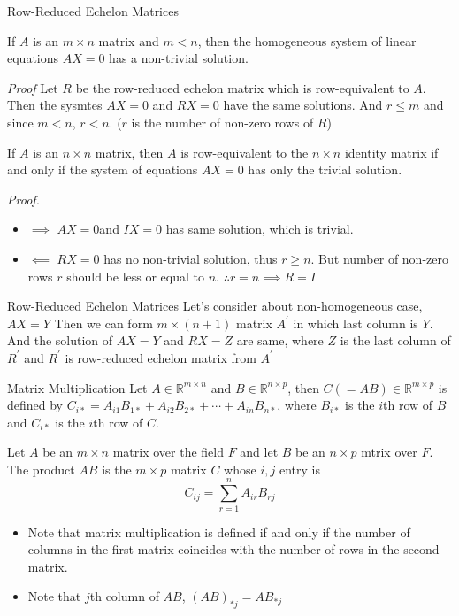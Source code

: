 \documentclass[8pt]{beamer}
\newcommand{\mbb}[1]{\mathbb{#1}}
\newcommand{\ti}[1]{\textit{#1}}
\begin{document}
\begin{frame}{Row-Reduced Echelon Matrices}
  \begin{theorem}
    If $A$ is an $m \times n$ matrix and $m < n$, then the homogeneous system of linear equations $AX=0$ has a non-trivial solution.
  \end{theorem}
  \ti{Proof} Let $R$ be the row-reduced echelon matrix which is row-equivalent to $A$. Then the sysmtes $AX = 0$ and $RX=0$ have the same solutions. And $r \leq m$ and since $m < n$, $r < n$. ($r$ is the number of non-zero rows of $R$)

  \begin{theorem}\label{th:1}
    If $A$ is an $n \times n$ matrix, then $A$ is row-equivalent to the $n\times n$ identity matrix if and only if the system of equations $AX = 0$ has only the trivial solution.
  \end{theorem}
  \ti{Proof.} 
  \begin{itemize}
    \item $\implies$ $AX =0 $and $IX = 0$ has same solution, which is trivial.
    \item  $\impliedby$  $RX = 0$ has no non-trivial solution, thus $r \geq n$. But number of non-zero rows $r$ should be less or equal to $n$. $\therefore r = n \implies R = I$
  \end{itemize}
\end{frame}

\begin{frame}{Row-Reduced Echelon Matrices}
  Let's consider about non-homogeneous case, $AX = Y$
  Then we can form $m \times (n +1)$ matrix $A^\prime$ in which last column is $Y$. And the solution of $AX=Y$ and $RX=Z$ are same, where $Z$ is the last column of $R^\prime$ and $R^\prime$ is row-reduced echelon matrix from $A^\prime$
\end{frame}

\begin{frame}{Matrix Multiplication}
  Let $A \in \mbb{R}^{m \times n}$ and $B \in \mbb{R}^{n \times p}$, then $C (= AB) \in \mbb{R}^{m \times p}$ is defined by $C_{i *} = A_{i1}B_{1 *} + A_{i2} B_{2 *} + \cdots + A_{in} B_{n*}$, where $B_{i *}$ is the $i$th row of $B$ and $C_{i*}$ is the $i$th row of $C$.

  \begin{definition}
    Let $A$ be an $m \times n $ matrix over the field $F$ and let $B$ be an $n \times p$ mtrix over $F$. The product $AB$ is the $m \times p$ matrix $C$ whose $i,j$ entry is
    \[
      C_{ij} = \sum_{r=1}^n A_{ir}B_{rj}
    \]
  \end{definition}

  \begin{itemize}
    \item Note that matrix multiplication is defined if and only if the number of columns in the first matrix coincides with the number of rows in the second matrix.
    \item Note that $j$th column of $AB$, $(AB)_{*j} = AB_{*j}$
  \end{itemize}
\end{frame}
\end{document}
